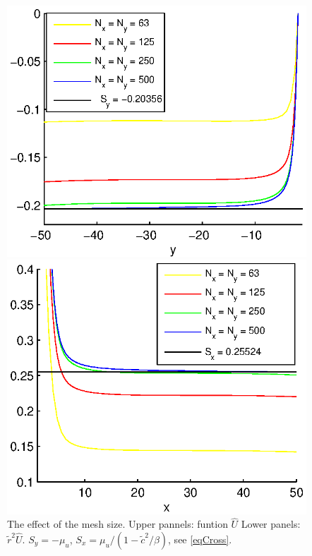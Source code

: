 \documentclass[12pt]{article}
\theoremstyle{theorem}
\theoremstyle{defi}
\begin{document}
\begin{figure}[ht]
\begin{minipage}[b]{0.5\linewidth}
	\end{minipage}
	\begin{minipage}[b]{0.5\linewidth}
		\raggedleft
		\includegraphics[width=\linewidth]{crossSectionX=0FF.eps}
	\end{minipage}	
	\begin{minipage}[b]{0.5\linewidth}
		\raggedright
		 \includegraphics[width=\linewidth]{crossSectionY=0FF.eps}
	\end{minipage}
	\caption{The effect of the mesh size. Upper pannels: funtion $\widehat{U}$  Lower panels: $\tilde r^2 \widehat{U}$. $S_y = - \mu_u$, $S_x = \mu_u/(1- \tilde c ^2 / \beta)$, see \eqref{eqCross}. }
	\label{fig1}
\end{figure}
\end{document}
